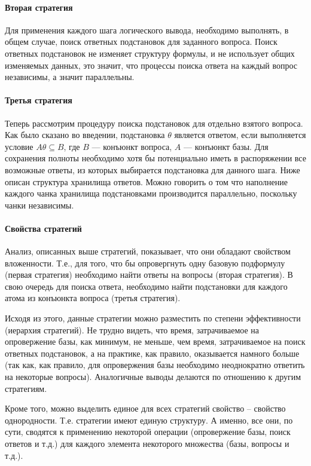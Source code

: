\paragraph{Вторая стратегия}
Для применения каждого шага логического вывода, необходимо выполнять, в общем случае, поиск ответных подстановок для заданного вопроса. Поиск ответных подстановок не изменяет структуру формулы, и не использует общих изменяемых данных, это значит, что процессы поиска ответа на каждый вопрос независимы, а значит параллельны.


\paragraph{Третья стратегия}
Теперь рассмотрим процедуру поиска подстановок для отдельно взятого вопроса.
Как было сказано во введении, подстановка $\theta$ является ответом, если выполняется
условие $A\theta \subseteq B$, где $B$ --- конъюнкт вопроса, $A$ --- конъюнкт базы.
Для сохранения полноты необходимо хотя бы потенциально иметь в распоряжении все возможные ответы,
из которых выбирается подстановка для данного шага. Ниже описан структура хранилища ответов. Можно говорить о том что наполнение каждого чанка хранилища подстановками производится параллельно, поскольку чанки независимы.

\paragraph{Свойства стратегий}

Анализ, описанных выше стратегий, показывает, что они обладают свойством вложенности. Т.е., для того, что бы опровергнуть одну базовую подформулу (первая стратегия) необходимо найти ответы на вопросы (вторая стратегия). В свою очередь для поиска ответа, необходимо найти подстановки для каждого атома из конъюнкта вопроса (третья стратегия).

Исходя из этого, данные стратегии можно разместить по степени эффективности (иерархия стратегий). Не трудно видеть, что время, затрачиваемое на опровержение базы, как минимум, не меньше, чем время, затрачиваемое на поиск ответных подстановок, а на практике, как правило, оказывается намного больше (так как, как правило, для опровержения базы необходимо неоднократно ответить на некоторые вопросы). Аналогичные выводы делаются по отношению к другим стратегиям.

Кроме того, можно выделить единое для всех стратегий свойство – свойство однородности. Т.е. стратегии имеют единую структуру. А именно, все они, по сути, сводятся к применению некоторой операции (опровержение базы, поиск ответов и т.д.) для каждого элемента некоторого множества (базы, вопросы и т.д.).

